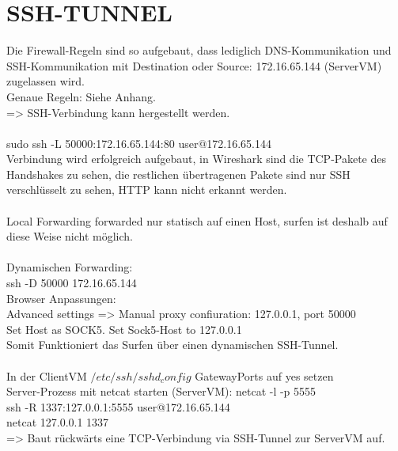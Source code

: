 \documentclass[12pt]{article}
\theoremstyle{plain}
\begin{document}
\section{SSH-TUNNEL}
Die Firewall-Regeln sind so aufgebaut, dass lediglich DNS-Kommunikation und SSH-Kommunikation mit Destination oder Source: 172.16.65.144 (ServerVM) zugelassen wird.\\
Genaue Regeln: Siehe Anhang.\\
=> SSH-Verbindung kann hergestellt werden.\\
\\
sudo ssh -L 50000:172.16.65.144:80 user@172.16.65.144\\
Verbindung wird erfolgreich aufgebaut, in Wireshark sind die TCP-Pakete des Handshakes zu sehen, die restlichen übertragenen Pakete sind nur SSH verschlüsselt zu sehen, HTTP kann nicht erkannt werden.\\
\\
Local Forwarding forwarded nur statisch auf einen Host, surfen ist deshalb auf diese Weise nicht möglich.\\
\\
Dynamischen Forwarding:\\
ssh -D 50000 172.16.65.144\\
Browser Anpassungen:\\
Advanced settings => Manual proxy confiuration: 127.0.0.1, port 50000\\
Set Host as SOCK5.
Set Sock5-Host to 127.0.0.1\\
Somit Funktioniert das Surfen über einen dynamischen SSH-Tunnel.\\
\\
In der ClientVM $/etc/ssh/sshd_config$ GatewayPorts auf yes setzen\\
Server-Prozess mit netcat starten (ServerVM):
netcat -l -p 5555\\
ssh -R 1337:127.0.0.1:5555 user@172.16.65.144\\
netcat 127.0.0.1 1337\\
=> Baut rückwärts eine TCP-Verbindung via SSH-Tunnel zur ServerVM auf.
\end{document}
